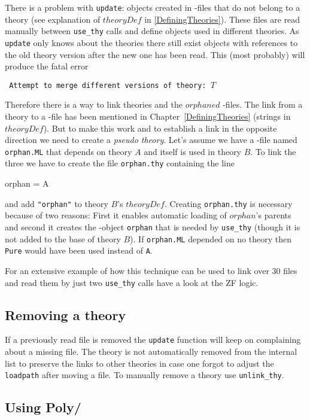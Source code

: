 There is a problem with {\tt update}: objects created in \ML-files that do not
belong to a theory (see explanation of $theoryDef$ in \ref{DefiningTheories}).
These files are read manually between {\tt use_thy} calls and define objects
used in different theories.  As {\tt update} only knows about the
theories there still exist objects with references to the old theory version
after the new one has been read.  This (most probably) will produce the fatal
error
\begin{center} \tt
Attempt to merge different versions of theory: $T$
\end{center}

Therefore there is a way to link theories and the $orphaned$ \ML-files. The
link from a theory to a \ML-file has been mentioned in
Chapter~\ref{DefiningTheories} (strings in $theoryDef$).  But to make this
work and to establish a link in the opposite direction we need to create a
{\it pseudo theory}.  Let's assume we have a \ML-file named {\tt orphan.ML} that
depends on theory $A$ and itself is used in theory $B$.  To link the three we
have to create the file {\tt orphan.thy} containing the line
\begin{ttbox}
orphan = A
\end{ttbox}
and add {\tt "orphan"} to theory $B$'s $theoryDef$.  Creating {\tt orphan.thy}
is necessary because of two reasons: First it enables automatic loading of
$orphan$'s parents and second it creates the \ML{}-object {\tt orphan} that
is needed by {\tt use_thy} (though it is not added to the base of theory $B$). 
If {\tt orphan.ML} depended on no theory then {\tt Pure} would have been used
instead of {\tt A}.

For an extensive example of how this technique can be used to link over 30
files and read them by just two {\tt use_thy} calls have a look at the ZF logic.


\subsection{Removing a theory}

If a previously read file is removed the {\tt update} function will keep
on complaining about a missing file.  The theory is not automatically removed
from the internal list to preserve the links to other theories in case one
forgot to adjust the {\tt loadpath} after moving a file.  To manually remove a
theory use {\tt unlink_thy}.


\subsection{Using Poly/\ML}

